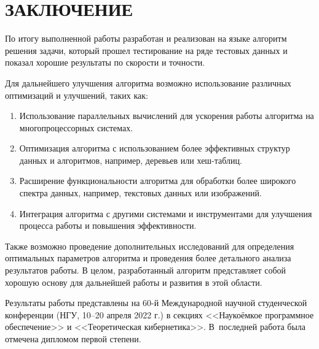 \section*{ЗАКЛЮЧЕНИЕ}


По итогу выполненной работы разработан и реализован на языке \CPP{} алгоритм решения задачи, который прошел тестирование на ряде тестовых данных и показал хорошие результаты по скорости и точности.

Для дальнейшего улучшения алгоритма возможно использование различных оптимизаций и улучшений, таких как:
\begin{enumerate}
    \item Использование параллельных вычислений для ускорения работы алгоритма на многопроцессорных системах.
    \item Оптимизация алгоритма с использованием более эффективных структур данных и алгоритмов, например, деревьев или хеш-таблиц.
    \item Расширение функциональности алгоритма для обработки более широкого спектра данных, например, текстовых данных или изображений.
    \item Интеграция алгоритма с другими системами и инструментами для улучшения процесса работы и повышения эффективности.
\end{enumerate}

Также возможно проведение дополнительных исследований для определения оптимальных параметров алгоритма и проведения более детального анализа результатов работы. В целом, разработанный алгоритм представляет собой хорошую основу для дальнейшей работы и развития в этой области.


Результаты работы представлены на 60-й Международной научной студенческой конференции (НГУ, 10--20 апреля 2022 г.) в секциях <<Наукоёмкое программное обеспечение>> и <<Теоретическая кибернетика>>. 
В~последней работа была отмечена дипломом первой степени.